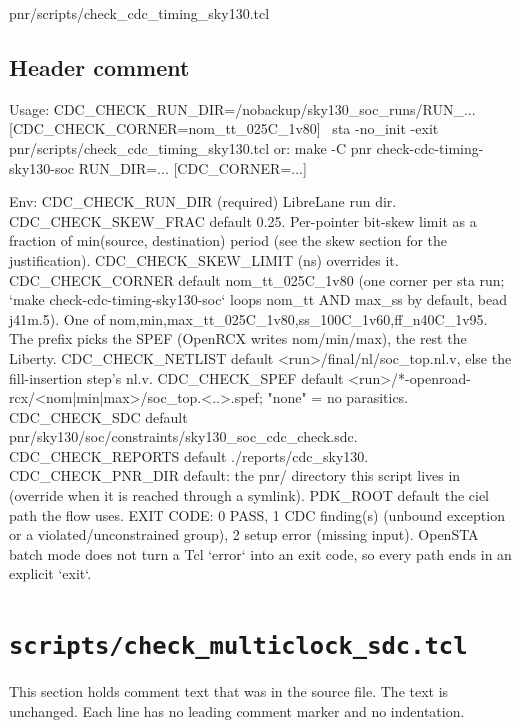 \begin{relocated}{pnr/scripts/check_cdc_timing_sky130.tcl}
\subsection*{Header comment}

\begin{textblock}
Usage:
  CDC_CHECK_RUN_DIR=/nobackup/sky130_soc_runs/RUN_... [CDC_CHECK_CORNER=nom_tt_025C_1v80] \
    sta -no_init -exit pnr/scripts/check_cdc_timing_sky130.tcl
or: make -C pnr check-cdc-timing-sky130-soc RUN_DIR=... [CDC_CORNER=...]

Env:
  CDC_CHECK_RUN_DIR   (required) LibreLane run dir.
  CDC_CHECK_SKEW_FRAC  default 0.25. Per-pointer bit-skew limit as a fraction of min(source, destination) period
                       (see the skew section for the justification). CDC_CHECK_SKEW_LIMIT (ns) overrides it.
  CDC_CHECK_CORNER    default nom_tt_025C_1v80 (one corner per sta run; `make check-cdc-timing-sky130-soc` loops nom_tt AND
                      max_ss by default, bead j41m.5). One of {nom,min,max}_{tt_025C_1v80,ss_100C_1v60,ff_n40C_1v95}.
                      The prefix picks the SPEF (OpenRCX writes nom/min/max), the rest the Liberty.
  CDC_CHECK_NETLIST   default <run>/final/nl/soc_top.nl.v, else the fill-insertion step's nl.v.
  CDC_CHECK_SPEF      default <run>/*-openroad-rcx/<nom|min|max>/soc_top.<..>.spef; "none" = no parasitics.
  CDC_CHECK_SDC       default pnr/sky130/soc/constraints/sky130_soc_cdc_check.sdc.
  CDC_CHECK_REPORTS   default ./reports/cdc_sky130.
  CDC_CHECK_PNR_DIR   default: the pnr/ directory this script lives in (override when it is reached through a symlink).
  PDK_ROOT            default the ciel path the flow uses.
EXIT CODE: 0 PASS, 1 CDC finding(s) (unbound exception or a violated/unconstrained group),
2 setup error (missing input). OpenSTA batch mode does not turn a Tcl `error` into an exit
code, so every path ends in an explicit `exit`.
\end{textblock}

\end{relocated}

\section{\texttt{scripts/check\_multiclock\_sdc.tcl}}\label{tm:pd:scripts-check-multiclock-sdc-tcl}

This section holds comment text that was in the source file. The text is unchanged. Each line has no leading comment marker and no indentation.

